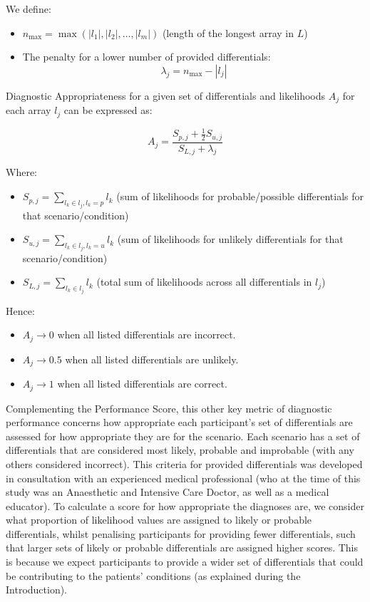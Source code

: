 \documentclass[a4paper, nobind]{templates/ociamthesis}
\begin{document}
\hfill\break
We define:

\begin{itemize}
\item
  \(n_{\text{max}} = \max(|l_1|, |l_2|, \ldots, |l_m|)\) (length of the longest array in \(L\))
\item
  The penalty for a lower number of provided differentials: \[
  \lambda_j = n_{\text{max}} - |l_j|
  \]
\end{itemize}

Diagnostic Appropriateness for a given set of differentials and likelihoods \(A_j\) for each array \(l_j\) can be expressed as:

\[
A_j = \frac{S_{p,j} + \frac{1}{2} S_{u,j}}{S_{L,j} + \lambda_j}
\]

Where:

\begin{itemize}
\item
  \(S_{p,j} = \sum_{l_k \in l_j, l_k = p} l_k\) (sum of likelihoods for probable/possible differentials for that scenario/condition)
\item
  \(S_{u,j} = \sum_{l_k \in l_j, l_k = u} l_k\) (sum of likelihoods for unlikely differentials for that scenario/condition)
\item
  \(S_{L,j} = \sum_{l_k \in l_j} l_k\) (total sum of likelihoods across all differentials in \(l_j\))
\end{itemize}

Hence:

\begin{itemize}
\item
  \(A_j \to 0\) when all listed differentials are incorrect.
\item
  \(A_j \to 0.5\) when all listed differentials are unlikely.
\item
  \(A_j \to 1\) when all listed differentials are correct.
\end{itemize}

Complementing the Performance Score, this other key metric of diagnostic performance concerns how appropriate each participant's set of differentials are assessed for how appropriate they are for the scenario. Each scenario has a set of differentials that are considered most likely, probable and improbable (with any others considered incorrect). This criteria for provided differentials was developed in consultation with an experienced medical professional (who at the time of this study was an Anaesthetic and Intensive Care Doctor, as well as a medical educator). To calculate a score for how appropriate the diagnoses are, we consider what proportion of likelihood values are assigned to likely or probable differentials, whilst penalising participants for providing fewer differentials, such that larger sets of likely or probable differentials are assigned higher scores. This is because we expect participants to provide a wider set of differentials that could be contributing to the patients' conditions (as explained during the Introduction).
\end{document}
